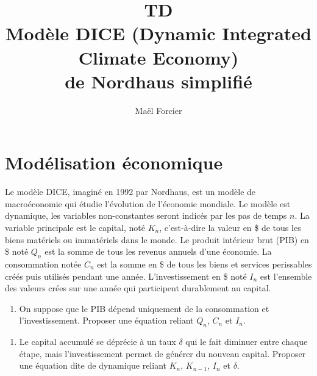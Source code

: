 \documentclass[12pt]{article}
\title{TD \\Modèle 
DICE (Dynamic Integrated Climate Economy) \\
de Nordhaus simplifié }
\author{Maël Forcier}
\newcommand{\rep}[1]{\textit{Réponse :} #1 \\}
\renewcommand{\rep}[1]{ }
\theoremstyle{remark}
\begin{document}
\maketitle


\section{Modélisation économique}

Le modèle DICE, imaginé en 1992 par Nordhaus, est un modèle de macroéconomie qui étudie l'évolution de l'économie mondiale.
Le modèle est dynamique, les variables non-constantes seront indicés par les pas de temps $n$.
La variable principale est le capital, noté $K_n$, c'est-à-dire la valeur en \$ de tous les biens matériels ou immatériels dans le monde.
Le produit intérieur brut (PIB) en \$ noté $Q_n$ est la somme de tous les revenus annuels d'une économie.
La consommation notée $C_n$ est la somme en \$ de tous les biens et services perissables créés puis utilisés pendant une année.
L'investissement en \$ noté $I_n$ est l'ensemble des valeurs crées sur une année qui participent durablement au capital.

\begin{enumerate}
\item On suppose que le PIB dépend uniquement de la consommation et l'investissement. Proposer une équation reliant $Q_n$, $C_n$ et $I_n$.
\end{enumerate}
\rep{ $Q_{n}=C_n + I_n$ }
\begin{enumerate}[resume]
\item  Le capital accumulé se déprécie à un taux $\delta$ qui le fait diminuer entre chaque étape, mais l'investissement permet de générer du nouveau capital. Proposer une équation dite de dynamique reliant $K_{n}$, $K_{n-1}$, $I_n$ et $\delta$.
\end{enumerate}
\rep{ $K_{n}=(1-\delta)K_{n-1}+I_n$ }
\end{document}
